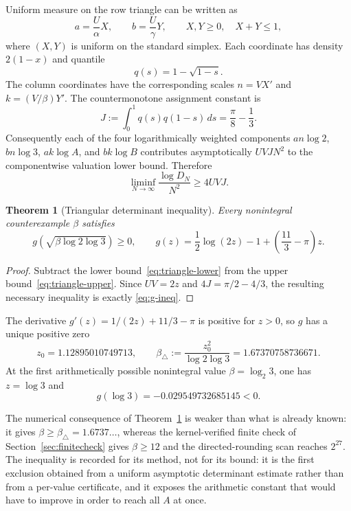 \documentclass[11pt,oneside]{article}
\newtheorem{theorem}{Theorem}[section]
\theoremstyle{definition}
\theoremstyle{remark}
\begin{document}
Uniform measure on the row triangle can be written as
\[
 a=\frac U\alpha X,\qquad b=\frac U\gamma Y,
 \qquad X,Y\ge0,\quad X+Y\le1,
\]
where $(X,Y)$ is uniform on the standard simplex.  Each coordinate has density
$2(1-x)$ and quantile
\[
 q(s)=1-\sqrt{1-s}.
\]
The column coordinates have the corresponding scales
$n=V X'$ and $k=(V/\beta)Y'$.
The countermonotone assignment constant is
\begin{equation}\label{eq:J}
 J:=\int_0^1q(s)q(1-s)\,ds
 =\frac\pi8-\frac13.
\end{equation}
Consequently each of the four logarithmically weighted components
$an\log2$, $bn\log3$, $ak\log A$, and $bk\log B$ contributes asymptotically
$UVJ N^2$ to the componentwise valuation lower bound.  Therefore
\begin{equation}\label{eq:triangle-lower}
 \liminf_{N\to\infty}\frac{\log D_N}{N^2}\ge4UVJ.
\end{equation}

\begin{theorem}[Triangular determinant inequality]\label{thm:triangle-inequality}
Every nonintegral counterexample $\beta$ satisfies
\begin{equation}\label{eq:g-ineq}
 \boxed{
 g\!\left(\sqrt{\beta\log2\log3}\right)\ge0,
 \qquad
 g(z)=\frac12\log(2z)-1+\left(\frac{11}{3}-\pi\right)z.}
\end{equation}
\end{theorem}
\begin{proof}
Subtract the lower bound~\eqref{eq:triangle-lower} from the upper
bound~\eqref{eq:triangle-upper}.  Since $UV=2z$ and
$4J=\pi/2-4/3$, the resulting necessary inequality is exactly
\eqref{eq:g-ineq}.
\end{proof}

The derivative $g'(z)=1/(2z)+11/3-\pi$ is positive for $z>0$, so $g$ has a
unique positive zero
\[
 z_0=1.12895010749713,
 \qquad
 \beta_\triangle:=\frac{z_0^2}{\log2\log3}=1.67370758736671.
\]
At the first arithmetically possible nonintegral value
$\beta=\log_2 3$, one has $z=\log3$ and
\[
 g(\log3)=-0.029549732685145<0.
\]

The numerical consequence of Theorem~\ref{thm:triangle-inequality}
is weaker than what is already known: it gives $\beta\ge\beta_\triangle=1.6737\ldots$, whereas the
kernel-verified finite check of Section~\ref{sec:finitecheck} gives
$\beta\ge12$ and the directed-rounding scan reaches $2^{27}$.
The inequality is recorded for its method, not for its bound: it is the first
exclusion obtained from a uniform asymptotic determinant estimate rather than from
a per-value certificate, and it exposes the arithmetic constant that would have to
improve in order to reach all $A$ at once.
\end{document}
